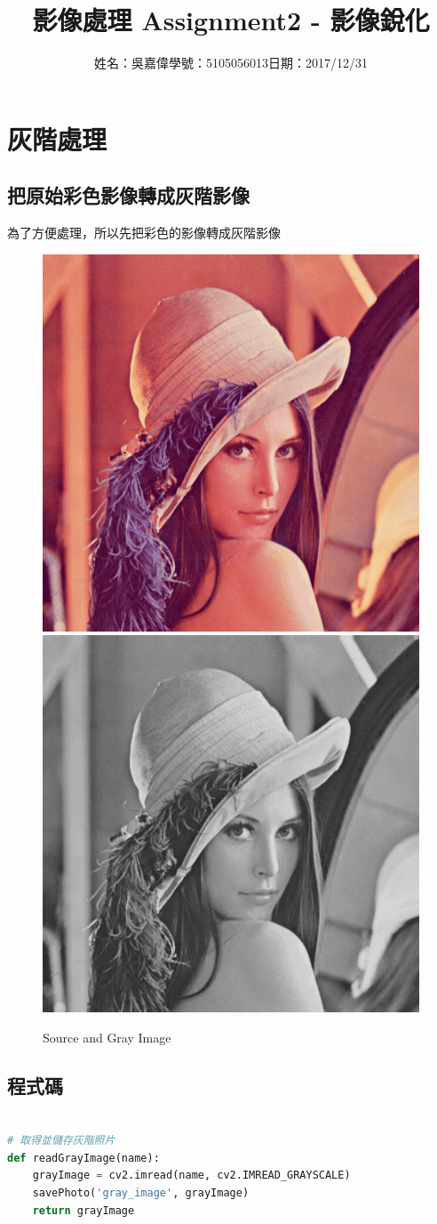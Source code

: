 \documentclass[12pt,a4paper]{article}
\title{\huge 影像處理 Assignment2 - 影像銳化} %
\author{姓名：吳嘉偉\quad 學號：5105056013\quad 日期：2017/12/31} %
\date{} %
\begin{document}
\clearpage

\maketitle %

\section{灰階處理}

\subsection{把原始彩色影像轉成灰階影像}

{
\fontsize{14pt}{10pt} %
\selectfont %
為了方便處理，所以先把彩色的影像轉成灰階影像
\begin{figure}[ht]
\centering
\includegraphics[width=.4\textwidth]{image/source.png}
\hspace{1cm}
\includegraphics[width=.4\textwidth]{image/gray_image.png}
\caption{Source and Gray Image}%
\label{要合併的兩張圖}%
\end{figure}
}

\newpage %
\subsection{程式碼}

{
\begin{lstlisting}[language=Python]

# 取得並儲存灰階照片
def readGrayImage(name):
    grayImage = cv2.imread(name, cv2.IMREAD_GRAYSCALE)
    savePhoto('gray_image', grayImage)
    return grayImage
    
\end{lstlisting}
}
\end{document}
